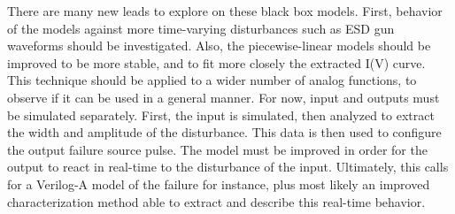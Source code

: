 There are many new leads to explore on these black box models.
First, behavior of the models against more time-varying disturbances such as ESD gun waveforms should be investigated.
Also, the piecewise-linear models should be improved to be more stable, and to fit more closely the extracted I(V) curve.
This technique should be applied to a wider number of analog functions, to observe if it can be used in a general manner.
For now, input and outputs must be simulated separately.
First, the input is simulated, then analyzed to extract the width and amplitude of the disturbance.
This data is then used to configure the output failure source pulse.
The model must be improved in order for the output to react in real-time to the disturbance of the input.
Ultimately, this calls for a Verilog-A model of the failure for instance, plus most likely an improved characterization method able to extract and describe this real-time behavior.

